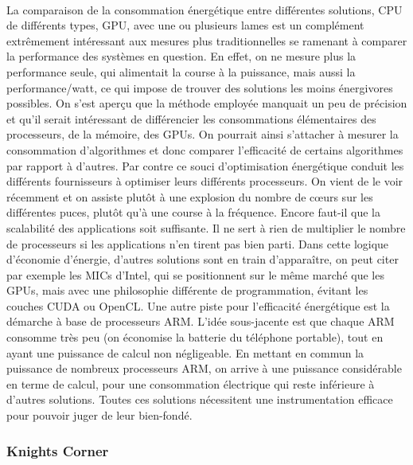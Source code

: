 \documentclass{article}
\begin{document}
				\paragraph{}
				La comparaison de la consommation énergétique entre différentes solutions, CPU de différents types, GPU, avec 
				une ou plusieurs lames est un complément extrêmement intéressant aux mesures plus traditionnelles se ramenant 
				à comparer la performance des systèmes en question.
				En effet, on ne mesure plus la performance seule, qui alimentait la course à la puissance, mais aussi la 
				performance/watt, ce qui impose de trouver des solutions les moins énergivores possibles.
				On s'est aperçu que la méthode employée manquait un peu de précision et qu'il serait intéressant de 
				différencier les consommations élémentaires des processeurs, de la mémoire, des GPUs. 
				On pourrait ainsi s'attacher à mesurer la consommation d'algorithmes et donc comparer l'efficacité de 
				certains algorithmes par rapport à d'autres. \newline
				Par contre ce souci d'optimisation énergétique conduit les différents fournisseurs à optimiser leurs 
				différents processeurs. On vient de le voir récemment et on assiste plutôt à une explosion du nombre de cœurs 
				sur les différentes puces, plutôt qu'à une course à la fréquence.
				Encore faut-il que la scalabilité des applications soit suffisante. Il ne sert à rien de multiplier le nombre 
				de processeurs si les applications n'en tirent pas bien parti. \newline
				Dans cette logique d'économie d'énergie, d'autres solutions sont en train d'apparaître, on peut citer par 
				exemple les MICs d'Intel, qui se positionnent sur le même marché que les GPUs, mais avec une philosophie 
				différente de programmation, évitant les couches CUDA ou OpenCL. \newline
				Une autre piste pour l'efficacité énergétique est la démarche à base de processeurs ARM. L'idée sous-jacente est 
				que chaque ARM consomme très peu (on économise la batterie du téléphone portable), tout en ayant une puissance 
				de calcul non négligeable. En mettant en commun la puissance de nombreux processeurs ARM, on arrive à une 
				puissance considérable en terme de calcul, pour une consommation électrique qui reste inférieure à d'autres 
				solutions. \newline
				Toutes ces solutions nécessitent une instrumentation efficace pour pouvoir juger de leur bien-fondé.
			\subsubsection{Knights Corner}
\end{document}
